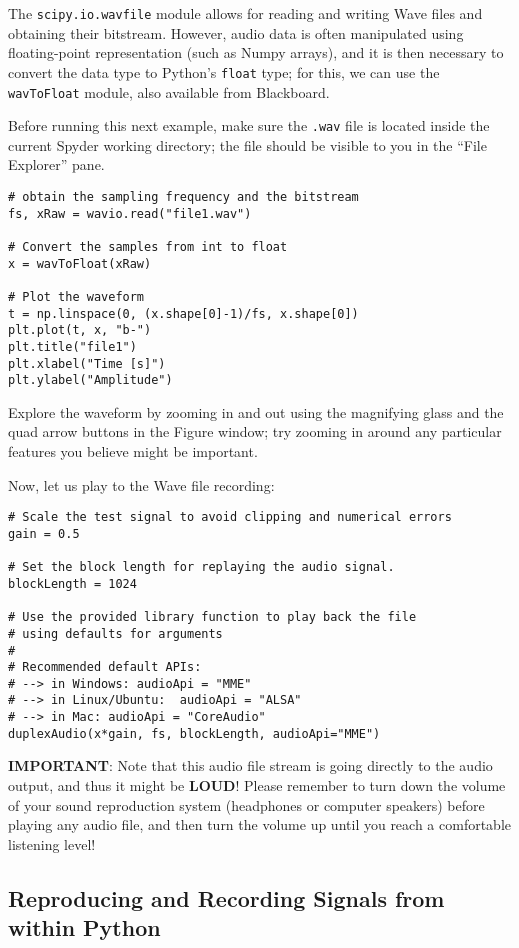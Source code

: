 The {\tt scipy.io.wavfile} module allows for reading and writing Wave files and obtaining their bitstream. However, audio data is often manipulated using floating-point representation (such as Numpy arrays), and it is then necessary to convert the data type to Python's {\tt float} type; for this, we can use the {\tt wavToFloat} module, also available from Blackboard.

Before running this next example, make sure the {\tt .wav} file is located inside the current Spyder working directory; the file should be visible to you in the ``File Explorer'' pane.

\begin{lstlisting}[frame=single]
# obtain the sampling frequency and the bitstream
fs, xRaw = wavio.read("file1.wav")

# Convert the samples from int to float
x = wavToFloat(xRaw)

# Plot the waveform
t = np.linspace(0, (x.shape[0]-1)/fs, x.shape[0])
plt.plot(t, x, "b-")
plt.title("file1")
plt.xlabel("Time [s]")
plt.ylabel("Amplitude")
\end{lstlisting}

Explore the waveform by zooming in and out using the magnifying glass and the quad arrow buttons in the Figure window; try zooming in around any particular features you believe might be important.

Now, let us play to the Wave file recording:

\begin{lstlisting}[frame=single]
# Scale the test signal to avoid clipping and numerical errors
gain = 0.5

# Set the block length for replaying the audio signal.
blockLength = 1024

# Use the provided library function to play back the file
# using defaults for arguments
#
# Recommended default APIs:
# --> in Windows: audioApi = "MME"
# --> in Linux/Ubuntu:  audioApi = "ALSA"
# --> in Mac: audioApi = "CoreAudio"
duplexAudio(x*gain, fs, blockLength, audioApi="MME")
\end{lstlisting}

\textbf{IMPORTANT}: Note that this audio file stream is going directly to the audio output, and thus it might be \textbf{LOUD}! Please remember to turn down the volume of your sound reproduction system (headphones or computer speakers) before playing any audio file, and then turn the volume up until you reach a comfortable listening level!

\subsection{Reproducing and Recording Signals from within Python}

